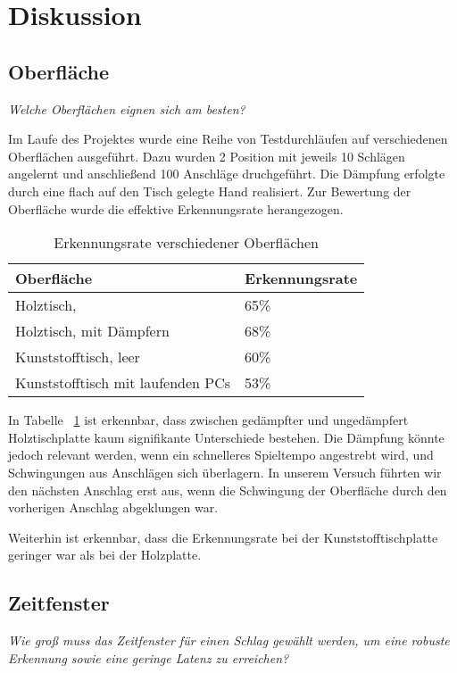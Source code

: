 \section{Diskussion}

\subsection*{Oberfläche}
\textit{Welche Oberflächen eignen sich am besten?}

Im Laufe des Projektes wurde eine Reihe von Testdurchläufen auf verschiedenen Oberflächen ausgeführt. Dazu wurden 2 Position mit jeweils 10 Schlägen angelernt und anschließend 100 Anschläge druchgeführt. Die Dämpfung erfolgte durch eine flach auf den Tisch gelegte Hand realisiert. Zur Bewertung der Oberfläche wurde die effektive Erkennungsrate herangezogen.


\begin{table}[h]   
	\centering
     
     \caption{Erkennungsrate verschiedener Oberflächen}
     \label{tab:surf}
\begin{tabular}{l l}
Oberfläche & Erkennungsrate \\
\hline
Holztisch, & 65\% \\
Holztisch, mit Dämpfern & 68\% \\
Kunststofftisch, leer & 60\% \\
Kunststofftisch mit laufenden PCs & 53\% \\

\end{tabular}
\end{table}



In Tabelle ~\ref{tab:surf} ist erkennbar, dass zwischen gedämpfter und ungedämpfert Holztischplatte kaum signifikante Unterschiede bestehen. Die Dämpfung könnte jedoch relevant werden, wenn ein schnelleres Spieltempo angestrebt wird, und Schwingungen aus Anschlägen sich überlagern. In unserem Versuch führten wir den nächsten Anschlag erst aus, wenn die Schwingung der Oberfläche durch den vorherigen Anschlag abgeklungen war.

Weiterhin ist erkennbar, dass die Erkennungsrate bei der Kunststofftischplatte geringer war als bei der Holzplatte.


\subsection*{Zeitfenster}
\textit{Wie groß muss das Zeitfenster für einen Schlag gewählt werden, um eine robuste Erkennung sowie eine geringe Latenz zu erreichen?}

